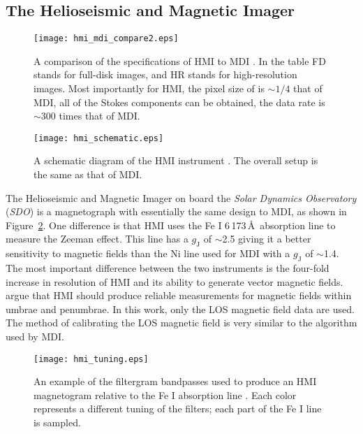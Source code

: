 \subsection{The Helioseismic and Magnetic Imager}\label{subsect:hmi}

\begin{figure}[!t]
\centerline{\texttt{[image: hmi\_mdi\_compare2.eps]}}
\caption[A comparison between MDI and HMI.]{A comparison of the specifications of HMI to MDI \citep[from][]{Schou:2012}. In the table FD stands for full-disk images, and HR stands for high-resolution images. Most importantly for HMI, the pixel size of is $\sim$$1/4$ that of MDI, all of the Stokes components can be obtained, the data rate is $\sim$300 times that of MDI.}
\label{fig:hmimdicompare}
\end{figure}

\begin{figure}[!t]
\centerline{\texttt{[image: hmi\_schematic.eps]}}
\caption[A schematic of HMI.]{A schematic diagram of the HMI instrument \citep[from][]{Schou:2012}. The overall setup is the same as that of MDI.}
\label{fig:hmidiagram}
\end{figure}

The Helioseismic and Magnetic Imager \citep[HMI;][]{Scherrer:2012} on board the \emph{Solar Dynamics Observatory} (\emph{SDO}) is a magnetograph with essentially the same design to MDI, as shown in Figure~\ref{fig:hmidiagram}. One difference is that HMI uses the Fe I 6\,173\,\AA\  absorption line to measure the Zeeman effect. This line has a $g_{\mathrm{J}}$ of $\sim$2.5 giving it a better sensitivity to magnetic fields than the Ni line used for MDI with a $g_{\mathrm{J}}$ of $\sim$1.4. The most important difference between the two instruments is the four-fold increase in resolution of HMI and its ability to generate vector magnetic fields. \citet{Norton:2006} argue that HMI should produce reliable measurements for magnetic fields within umbrae and penumbrae. In this work, only the \gls{LOS} magnetic field data are used. The method of calibrating the \gls{LOS} magnetic field is very similar to the algorithm used by MDI. 

\begin{figure}[!t]
\centerline{\texttt{[image: hmi\_tuning.eps]}}
\caption[A plot of the HMI filtergram bandpasses.]{An example of the filtergram bandpasses used to produce an HMI magnetogram relative to the Fe I absorption line \citep[from][]{Schou:2012}. Each color represents a different tuning of the filters; each part of the Fe I line is sampled.}
\label{fig:hmituning}
\end{figure}

